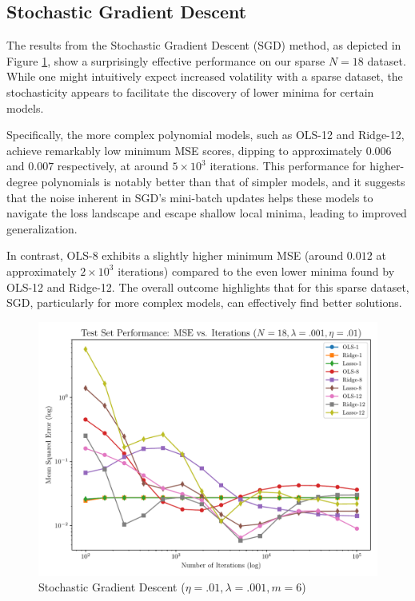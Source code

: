 \documentclass[twocolumn,aps]{revtex4}
\begin{document}
\subsection{Stochastic Gradient Descent}
The results from the Stochastic Gradient Descent (SGD) method, as depicted in Figure \ref{fig:GradSGD}, show a surprisingly effective performance on our sparse $N=18$ dataset. 
While one might intuitively expect increased volatility with a sparse dataset, the stochasticity appears to facilitate the discovery of lower minima for certain models.

Specifically, the more complex polynomial models, such as OLS-12 and Ridge-12, achieve remarkably low minimum MSE scores, dipping to approximately $0.006$ and $0.007$ respectively, at around $5 \times 10^3$ iterations. This performance for higher-degree polynomials is notably better than that of simpler models, and it suggests that the noise inherent in SGD's mini-batch updates helps these models to navigate the loss landscape and escape shallow local minima, leading to improved generalization.

In contrast, OLS-8 exhibits a slightly higher minimum MSE (around $0.012$ at approximately $2 \times 10^3$ iterations) compared to the even lower minima found by OLS-12 and Ridge-12. 
The overall outcome highlights that for this sparse dataset, SGD, particularly for more complex models, can effectively find better solutions.


\begin{figure}[h]
    \centering
    \includegraphics[width=.95 \linewidth]{Figures/StochasticDescent.pdf}
    \caption{Stochastic Gradient Descent ($\eta=.01, \lambda=.001, m=6$)}
    \label{fig:GradSGD}
\end{figure}
\end{document}
